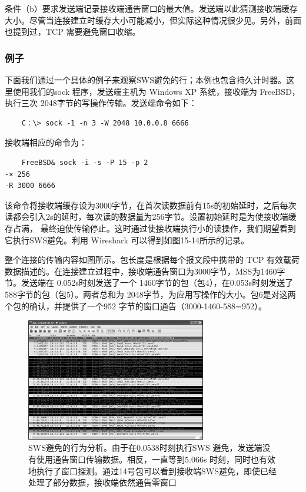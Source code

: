条件（b）要求发送端记录接收端通告窗口的最大值。发送端以此猜测接收端缓存大小。尽管当连接建立时缓存大小可能减小，但实际这种情况很少见。另外，前面也提到过，TCP
需要避免窗口收缩。

\subsubsection{例子}
下面我们通过一个具体的例子来观察SWS避免的行；本例也包含持久计时器。这里使用我们的sock 程序，发送端主机为 Windows XP 系统，接收端为 FreeBSD，执行三次
2048字节的写操作传输。发送端命令如下：
\begin{verbatim}
    C：\> sock -1 -n 3 -W 2048 10.0.0.8 6666
\end{verbatim}
接收端相应的命令为：
\begin{verbatim}
    FreeBSD& sock -i -s -P 15 -p 2
-× 256
-R 3000 6666
\end{verbatim}

该命令将接收端缓存设为3000字节，在首次读数据前有15s的初始延时，之后每次读都会引入2s的延时，每次读的数据量为256字节。设置初始延时是为使接收端缓存占满，
最终迫使传输停止。这时通过使接收端执行小的读操作，我们期望看到它执行SWS避免。利用 Wireshark 可以得到如图15-14所示的记录。

整个连接的传输内容如图所示。包长度是根据每个报文段中携带的 TCP 有效载荷数据描述的。在连接建立过程中，接收端通告窗口为3000字节，MSS为1460字节。发送端在
0.052s时刻发送了一个 1460字节的包（包4），在0.053s时刻发送了588字节的包（包5）。两者总和为 2048字节，为应用写操作的大小。包6是对这两个包的确认，并提供了一个952
字节的窗口通告（3000-1460-588=952）。
\begin{figure}[!htb]
    \centering
	\includegraphics[width=0.7\textwidth]{imgs/15/15-14.png}
	\caption{SWS避免的行为分析。由于在0.0538时刻执行SWS 避免，发送端没有使用通告窗口传输数据。相反，一直等到5.066s 时刻，同时也有效地执行了窗口探测。通过14号包可以看到接收端SWS避免，即使已经处理了部分数据，接收端依然通告零窗口}
\end{figure}

